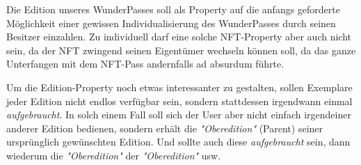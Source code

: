 
Die Edition unseres WunderPasses soll als Property auf die anfangs geforderte Möglichkeit einer gewissen Individualisierung des WunderPasses durch seinen Besitzer einzahlen. Zu individuell darf eine solche NFT-Property aber auch nicht sein, da der NFT zwingend seinen Eigentümer wechseln können soll, da das ganze Unterfangen mit dem NFT-Pass andernfalls ad absurdum führte.

Um die Edition-Property noch etwas interessanter zu gestalten, sollen Exemplare jeder Edition nicht endlos verfügbar sein, sondern stattdessen irgendwann einmal \textit{aufgebraucht}. In solch einem Fall soll sich der User aber nicht einfach irgendeiner anderer Edition bedienen, sondern erhält die \textit{"Oberedition"} (Parent) seiner ursprünglich gewünschten Edition. Und sollte auch diese \textit{aufgebraucht} sein, dann wiederum die \textit{"Oberedition"} der \textit{"Oberedition"} usw. 

\vspace{0.2cm}

